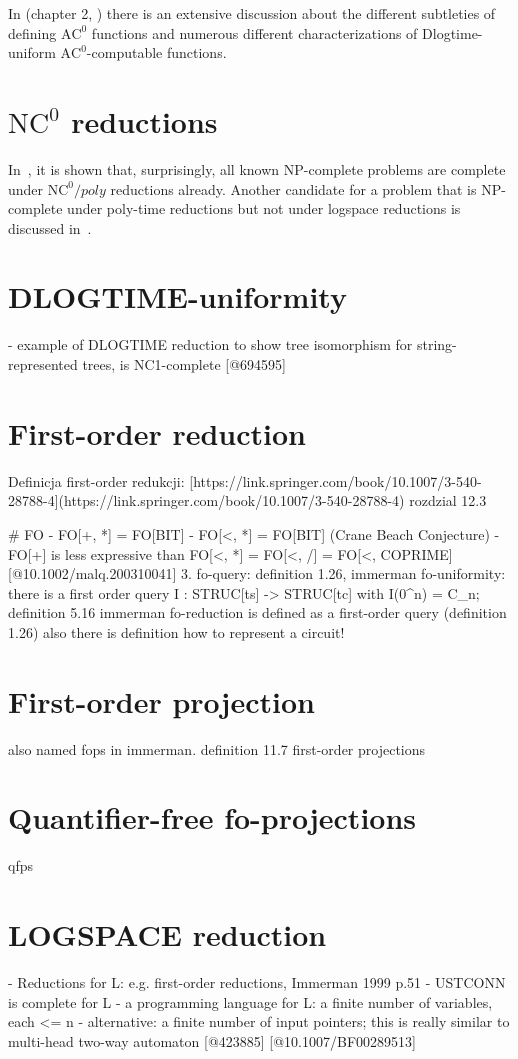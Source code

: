 In (chapter 2, \cite{edbd4873718c414f90d22dadf0dba2b1}) there is an extensive discussion about
the different subtleties of defining $\text{AC}^0$ functions and numerous different characterizations
of Dlogtime-uniform $\text{AC}^0$-computable functions.


\section{\texorpdfstring{$\text{NC}^0$}{NC\string^0} reductions}
In~\cite{edbd4873718c414f90d22dadf0dba2b1}, it is shown that, surprisingly, all known NP-complete problems
are complete under $\text{NC}^0/poly$ reductions already. Another candidate for a problem that is NP-complete
under poly-time reductions but not under logspace reductions is discussed in~\cite{18631}.

\section{DLOGTIME-uniformity}
- example of DLOGTIME reduction to show tree isomorphism for string-represented trees, is NC1-complete [@694595]


\section{First-order reduction}
Definicja first-order redukcji:  
[https://link.springer.com/book/10.1007/3-540-28788-4](https://link.springer.com/book/10.1007/3-540-28788-4)  
rozdzial 12.3

# FO
- FO[+, *] = FO[BIT]
- FO[<, *] = FO[BIT] (Crane Beach Conjecture)
- FO[+] is less expressive than FO[<, *] = FO[<, /] = FO[<, COPRIME] [@10.1002/malq.200310041]
3. fo-query: definition 1.26, immerman
fo-uniformity: there is a first order query I : STRUC[ts] -> STRUC[tc] with I(0^n) = C_n; definition 5.16 immerman
fo-reduction is defined as a first-order query (definition 1.26)
also there is definition how to represent a circuit!

\section{First-order projection}
also named fops in immerman.
definition 11.7 first-order projections
\section{Quantifier-free fo-projections}
qfps

\section{LOGSPACE reduction}
- Reductions for L: e.g. first-order reductions, Immerman 1999 p.51
- USTCONN is complete for L
- a programming language for L: a finite number of variables, each <= n
- alternative: a finite number of input pointers; this is really similar to multi-head two-way automaton [@423885] [@10.1007/BF00289513]

